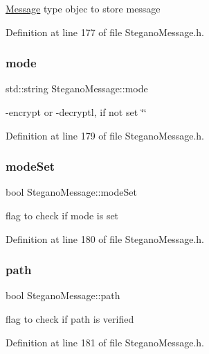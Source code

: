 \mbox{\hyperlink{classMessage}{Message}} type objec to store message 

Definition at line 177 of file Stegano\+Message.\+h.

\mbox{\label{classSteganoMessage_a8772194b7823da730648f8d4c06334a8}} 
\subsubsection{\texorpdfstring{mode}{mode}}
{\footnotesize\ttfamily std\+::string Stegano\+Message\+::mode\hspace{0.3cm}{\ttfamily [private]}}

-\/encrypt or -\/decryptl, if not set \char`\"{}\char`\"{} 

Definition at line 179 of file Stegano\+Message.\+h.

\mbox{\label{classSteganoMessage_ae1da17c621a8db71fa4eb3b148a82ceb}} 
\subsubsection{\texorpdfstring{modeSet}{modeSet}}
{\footnotesize\ttfamily bool Stegano\+Message\+::mode\+Set\hspace{0.3cm}{\ttfamily [private]}}

flag to check if mode is set 

Definition at line 180 of file Stegano\+Message.\+h.

\mbox{\label{classSteganoMessage_a399f4c181d3b7b15ccdb5c925a7a1f51}} 
\subsubsection{\texorpdfstring{path}{path}}
{\footnotesize\ttfamily bool Stegano\+Message\+::path\hspace{0.3cm}{\ttfamily [private]}}

flag to check if path is verified 

Definition at line 181 of file Stegano\+Message.\+h.

